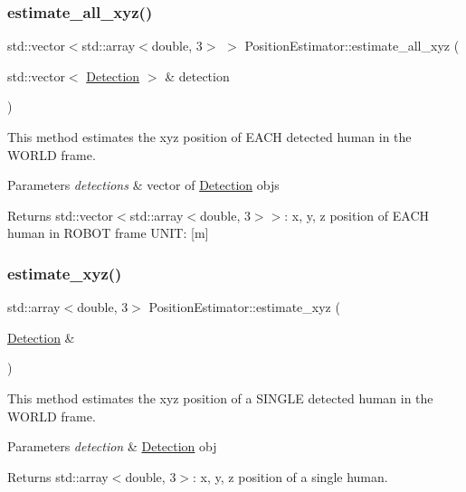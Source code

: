 \subsubsection{\texorpdfstring{estimate\+\_\+all\+\_\+xyz()}{estimate\_all\_xyz()}}
{\footnotesize\ttfamily std\+::vector$<$std\+::array$<$double, 3$>$ $>$ Position\+Estimator\+::estimate\+\_\+all\+\_\+xyz (\begin{DoxyParamCaption}\item[{std\+::vector$<$ \hyperlink{struct_detection}{Detection} $>$ \&}]{detection }\end{DoxyParamCaption})}



This method estimates the xyz position of E\+A\+CH detected human in the W\+O\+R\+LD frame. 


\begin{DoxyParams}{Parameters}
{\em detections} & vector of \hyperlink{struct_detection}{Detection} objs \\
\hline
\end{DoxyParams}
\begin{DoxyReturn}{Returns}
std\+::vector$<$std\+::array$<$double, 3$>$$>$\+: x, y, z position of E\+A\+CH human in R\+O\+B\+OT frame U\+N\+IT\+: \mbox{[}m\mbox{]} 
\end{DoxyReturn}
\mbox{\label{class_position_estimator_a90f4ced196e47ac347fcf53e834fbcab}} 
\subsubsection{\texorpdfstring{estimate\+\_\+xyz()}{estimate\_xyz()}}
{\footnotesize\ttfamily std\+::array$<$double, 3$>$ Position\+Estimator\+::estimate\+\_\+xyz (\begin{DoxyParamCaption}\item[{\hyperlink{struct_detection}{Detection} \&}]{ }\end{DoxyParamCaption})}



This method estimates the xyz position of a S\+I\+N\+G\+LE detected human in the W\+O\+R\+LD frame. 


\begin{DoxyParams}{Parameters}
{\em detection} & \hyperlink{struct_detection}{Detection} obj \\
\hline
\end{DoxyParams}
\begin{DoxyReturn}{Returns}
std\+::array$<$double, 3$>$\+: x, y, z position of a single human. 
\end{DoxyReturn}
\mbox{\label{class_position_estimator_a12ae9fe6ea2f7ca1e2054e018c5dabf5}} 

